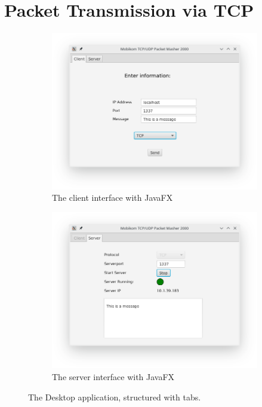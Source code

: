 \section{Packet Transmission via TCP}
\begin{figure}[H]
	\centering
	\begin{subfigure}{.49\textwidth}
		\centering
		\includegraphics[width=1.1\linewidth]{images/task1/client.png}
		\caption{The client interface with JavaFX}
		\label{fig:clientfx}
	\end{subfigure}%
	\begin{subfigure}{.49\textwidth}
		\centering
		\includegraphics[width=1.1\linewidth]{images/task1/server.png}
		\caption{The server interface with JavaFX}
		\label{fig:serverfx}
	\end{subfigure}
	\caption{The Desktop application, structured with tabs.}
	\label{fig:fx}
\end{figure}


